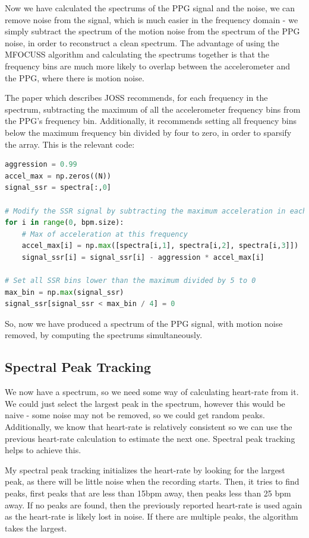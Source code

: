 \documentclass[12pt,a4paper,twoside,openright]{report}
\begin{document}
Now we have calculated the spectrums of the PPG signal and the noise, we can
remove noise from the signal, which is much easier in the frequency domain -
we simply subtract the spectrum of the motion noise from the spectrum of the
PPG noise, in order to reconstruct a clean spectrum. The advantage of using
the MFOCUSS algorithm and calculating the spectrums together is that the
frequency bins are much more likely to overlap between the accelerometer and
the PPG, where there is motion noise. 

The paper which describes JOSS \cite{Zhang15.2} recommends, for each frequency in the spectrum,
subtracting the maximum of all the accelerometer frequency bins from the PPG's
frequency bin. Additionally, it recommends setting all frequency bins below 
the maximum frequency bin divided by four to zero, in order to sparsify the array.
This is the relevant code:

\begin{lstlisting}[language=Python]
aggression = 0.99
accel_max = np.zeros((N))
signal_ssr = spectra[:,0]

# Modify the SSR signal by subtracting the maximum acceleration in each bin
for i in range(0, bpm.size):
    # Max of acceleration at this frequency
    accel_max[i] = np.max([spectra[i,1], spectra[i,2], spectra[i,3]])
    signal_ssr[i] = signal_ssr[i] - aggression * accel_max[i]

# Set all SSR bins lower than the maximum divided by 5 to 0
max_bin = np.max(signal_ssr)
signal_ssr[signal_ssr < max_bin / 4] = 0
\end{lstlisting}

So, now we have produced a spectrum of the PPG signal, with motion noise
removed, by computing the spectrums simultaneously.

\subsection{Spectral Peak Tracking}

We now have a spectrum, so we need some way of calculating heart-rate from it.
We could just select the largest peak in the spectrum, however this would be
naive - some noise may not be removed, so we could get random peaks.
Additionally, we know that heart-rate is relatively consistent so we can use
the previous heart-rate calculation to estimate the next one. Spectral peak
tracking helps to achieve this.

My spectral peak tracking initializes the heart-rate by looking for the
largest peak, as there will be little noise when the recording starts. Then,
it tries to find peaks, first peaks that are less than 15bpm away, then peaks
less than 25 bpm away. If no peaks are found, then the previously reported
heart-rate is used again as the heart-rate is likely lost in noise. If there
are multiple peaks, the algorithm takes the largest.
\end{document}
